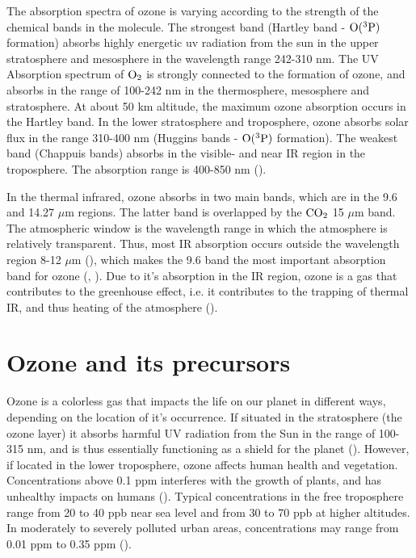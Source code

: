 \medskip

The absorption spectra of ozone is varying according to the strength of the chemical bands in the molecule. The strongest band (Hartley band - $\mathrm{O(^3P)}$ formation) absorbs highly energetic \acrfull{uv} radiation from the sun in the upper stratosphere and mesosphere in the wavelength range 242-310 nm. The UV Absorption spectrum of $\mathrm{O_2}$ is strongly connected to the formation of ozone, and absorbs in the range of 100-242 nm in the thermosphere, mesosphere and stratosphere. At about 50 km altitude, the maximum ozone absorption occurs in the Hartley band. In the lower stratosphere and troposphere, ozone absorbs solar flux in the range 310-400 nm (Huggins bands - $\mathrm{O(^3P)}$ formation). The weakest band (Chappuis bands) absorbs in the visible- and near IR region in the troposphere. The absorption range is 400-850 nm (\cite{Liou_AtmRad}). 



\medskip 

In the thermal infrared, ozone absorbs in two main bands, which are in the 9.6 and 14.27 $\mu$m regions. The latter band is overlapped by the $\mathrm{CO_2}$ 15 $\mu$m band. The atmospheric window is the wavelength range in which the atmosphere is relatively transparent. Thus, most IR absorption occurs outside the wavelength region 8-12 $\mu$m (\cite{AtmModFund}), which makes the 9.6 band the most important absorption band for ozone (\cite{Liou_AtmRad}, \cite{Myhre1997}). Due to it's absorption in the IR region, ozone is a gas that contributes to the greenhouse effect, i.e. it contributes to the trapping of thermal IR, and thus heating of the atmosphere (\cite{Liou_AtmRad}).



\section{Ozone and its precursors}\label{sec:ozone_and_precursors}

Ozone is a colorless gas that impacts the life on our planet in different ways, depending on the location of it's occurrence. If situated in the stratosphere (the ozone layer) it absorbs harmful UV radiation from the Sun in the range of 100-315 nm, and is thus essentially functioning as a shield for the planet (\cite{SeinfeldSpyros}). However, if located in the lower troposphere, ozone affects human health and vegetation. Concentrations above 0.1 \acrfull{ppm} interferes with the growth of plants, and has unhealthy impacts on humans (\cite{AtmModFund}). Typical concentrations in the free troposphere range from 20 to 40 \acrfull{ppb} near sea level and from 30 to 70 ppb at higher altitudes. In moderately to severely polluted urban areas, concentrations may range from 0.01 ppm to 0.35 ppm (\cite{AtmModFund}).  

